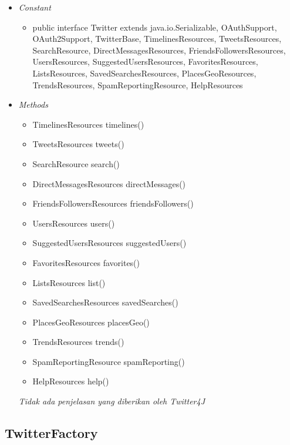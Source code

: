 	\begin{itemize}
		\item \textit{Constant}
		
		\begin{itemize}
			\item public interface Twitter
extends java.io.Serializable, OAuthSupport, OAuth2Support, TwitterBase, TimelinesResources, TweetsResources, SearchResource, DirectMessagesResources, FriendsFollowersResources, UsersResources, SuggestedUsersResources, FavoritesResources, ListsResources, SavedSearchesResources, PlacesGeoResources, TrendsResources, SpamReportingResource, HelpResources
			
		\end{itemize}
		
		\item \textit{Methods}
		
		\begin{itemize}
			\item TimelinesResources timelines()
			\item TweetsResources tweets()
			\item SearchResource search()
			\item DirectMessagesResources directMessages()
			\item FriendsFollowersResources friendsFollowers()
			\item UsersResources users()
			\item SuggestedUsersResources suggestedUsers()
			\item FavoritesResources favorites()
			\item ListsResources list()
			\item SavedSearchesResources savedSearches()
			\item PlacesGeoResources placesGeo()
			\item TrendsResources trends()
			\item SpamReportingResource spamReporting()
			\item HelpResources help()
		\end{itemize}
		\textit{Tidak ada penjelasan yang diberikan oleh Twitter4J}
	\end{itemize}
	
\subsection{TwitterFactory}
	

